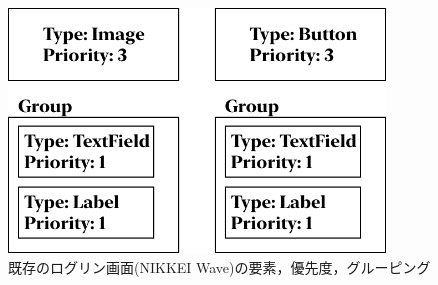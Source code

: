\begin{figure}[htbp]
  \begin{minipage}{\hsize}
    \begin{center}
       \includegraphics[width=100mm]{img/wave_ViewStructure.png}
    \end{center}
    \caption{既存のログリン画面(NIKKEI Wave)の要素，優先度，グルーピング}
    \label{fig:wave_ViewStructure}
  \end{minipage}
\end{figure}

